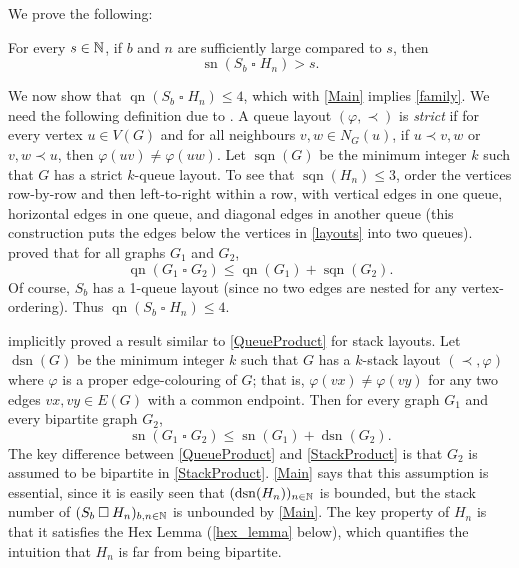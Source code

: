 \documentclass[kpfonts]{patmorin}
\DeclareMathOperator{\sn}{sn}
\DeclareMathOperator{\qn}{qn}
\DeclareMathOperator{\sqn}{sqn}
\DeclareMathOperator{\dsn}{dsn}
\renewcommand{\leq}{\leqslant}
\newcommand{\CartProd}{\mathbin{\square}}
\begin{document}
We prove the following:

\begin{thm}
\label{Main}
For every $s\in\mathbb{N}$, if $b$ and $n$ are sufficiently large compared to $s$, then $$\sn(S_b\CartProd H_n) > s.$$
\end{thm}

We now show that $\qn(S_b\CartProd H_n)\leq 4$, which with \cref{Main} implies \cref{family}. We need the following definition due to \citet{Wood-Queue-DMTCS05}. A queue layout $(\varphi,\prec)$ is \emph{strict} if for every vertex $u\in V(G)$ and for all neighbours $v,w\in N_G(u)$, if $u\prec v,w$ or $v,w \prec u$, then $\varphi(uv)\neq \varphi(uw)$. Let $\sqn(G)$ be the minimum integer $k$ such that $G$ has a strict $k$-queue layout. To see that $\sqn(H_n) \leq 3$, order the vertices row-by-row and then left-to-right within a row, with vertical edges in one queue, horizontal edges in one queue, and diagonal edges in another queue (this construction puts the edges below the vertices in \cref{layouts} into two queues). \citet{Wood-Queue-DMTCS05} proved that for all graphs $G_1$ and $G_2$,
\begin{equation}
\label{QueueProduct}
\qn(G_1 \CartProd G_2) \leq \qn(G_1) + \sqn(G_2).
\end{equation}
Of course, $S_b$ has a 1-queue layout (since no two edges are nested for any vertex-ordering). Thus $\qn(S_b \CartProd H_n)\leq 4$.

\citet{BK79} implicitly proved a result similar to \cref{QueueProduct} for stack layouts. Let $\dsn(G)$ be the minimum integer $k$ such that $G$ has a $k$-stack layout $(\prec,\varphi)$ where $\varphi$ is a proper edge-colouring of $G$; that is, $\varphi(vx)\neq\varphi(vy)$ for any two edges $vx,vy\in E(G)$ with a common endpoint. Then for every graph $G_1$ and every bipartite graph $G_2$,
\begin{equation}
\label{StackProduct}
\sn(G_1 \CartProd G_2) \leq \sn(G_1) + \dsn(G_2).
\end{equation}
The key difference between \cref{QueueProduct} and \cref{StackProduct} is that $G_2$ is assumed to be bipartite in \cref{StackProduct}. \cref{Main} says that this assumption is essential, since it is easily seen that $(\dsn(H_n))_{n\in\N}$ is bounded, but the stack number of $(S_b \CartProd H_n)_{b,n\in\N}$ is unbounded by \cref{Main}. The key property of $H_n$ is that it satisfies the Hex Lemma (\cref{hex_lemma} below), which quantifies the intuition that $H_n$ is far from being bipartite. 
\end{document}
